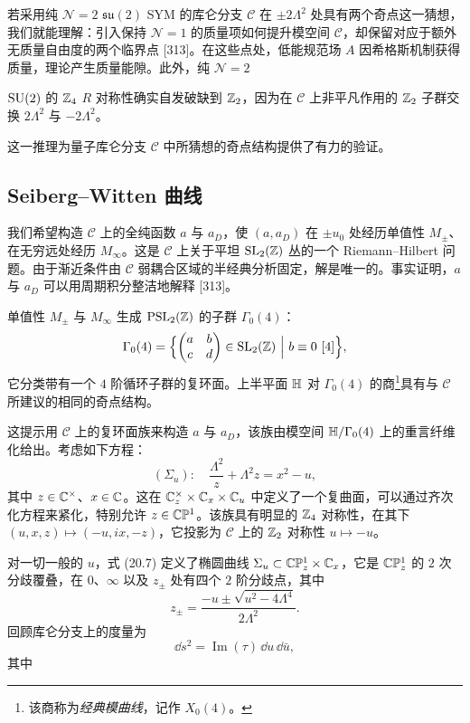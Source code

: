 若采用纯 $\mathcal{N}=2$ $\mathfrak{su}(2)$ SYM 的库仑分支 $\mathcal{C}$ 在 $\pm2\Lambda^2$ 处具有两个奇点这一猜想，我们就能理解：引入保持 $\mathcal{N}=1$ 的质量项如何提升模空间 $\mathcal{C}$，却保留对应于额外无质量自由度的两个临界点 [313]。在这些点处，低能规范场 $A$ 因希格斯机制获得质量，理论产生质量能隙。此外，纯 $\mathcal{N}=2$

$\operatorname{SU}(2)$ 的 $\mathbb{Z}_4$ $R$ 对称性确实自发破缺到 $\mathbb{Z}_2$，因为在 $\mathcal{C}$ 上非平凡作用的 $\mathbb{Z}_2$ 子群交换 $2\Lambda^2$ 与 $-2\Lambda^2$。

这一推理为量子库仑分支 $\mathcal{C}$ 中所猜想的奇点结构提供了有力的验证。

\subsection{Seiberg–Witten 曲线}

我们希望构造 $\mathcal{C}$ 上的全纯函数 $a$ 与 $a_D$，使 $(a,a_D)$ 在 $\pm u_0$ 处经历单值性 $M_\pm$、在无穷远处经历 $M_\infty$。这是 $\mathcal{C}$ 上关于平坦 $\operatorname{SL}_2(\mathbb{Z})$ 丛的一个 Riemann--Hilbert 问题。由于渐近条件由 $\mathcal{C}$ 弱耦合区域的半经典分析固定，解是唯一的。事实证明，$a$ 与 $a_D$ 可以用周期积分整洁地解释 [313]。

\begin{proposition}[20.12]
单值性 $M_\pm$ 与 $M_\infty$ 生成 $\mathrm{PSL}_2(\mathbb{Z})$ 的子群 $\Gamma_0(4)$：
\[
\Gamma_0(4)=\Bigl\{\begin{pmatrix}a&b\\c&d\end{pmatrix}\in\SL_2(\Z)\ \Big|\ b\equiv0\ [4]\Bigr\},
\]
它分类带有一个 $4$ 阶循环子群的复环面。上半平面 $\mathbb{H}$ 对 $\Gamma_0(4)$ 的商\footnote{该商称为\emph{经典模曲线}，记作 $X_0(4)$。}具有与 $\mathcal{C}$ 所建议的相同的奇点结构。
\end{proposition}

这提示用 $\mathcal{C}$ 上的复环面族来构造 $a$ 与 $a_D$，该族由模空间 $\mathbb{H}/\Gamma_0(4)$ 上的重言纤维化给出。考虑如下方程：
\begin{equation}
(\Sigma_u):\quad \frac{\Lambda^2}{z}+\Lambda^2 z=x^2-u,
\tag{20.7}
\end{equation}
其中 $z\in\mathbb{C}^\times$、$x\in\mathbb{C}$。这在 $\mathbb{C}^\times_z\times\mathbb{C}_x\times\mathbb{C}_u$ 中定义了一个复曲面，可以通过齐次化方程来紧化，特别允许 $z\in\mathbb{C}\mathbb{P}^1$。该族具有明显的 $\mathbb{Z}_4$ 对称性，在其下 $(u,x,z)\mapsto(-u,ix,-z)$，它投影为 $\mathcal{C}$ 上的 $\mathbb{Z}_2$ 对称性 $u\mapsto-u$。

对一切一般的 $u$，式 (20.7) 定义了椭圆曲线 $\Sigma_u\subset\mathbb{C}\mathbb{P}^1_z\times\mathbb{C}_x$，它是 $\mathbb{C}\mathbb{P}^1_z$ 的 $2$ 次分歧覆叠，在 $0$、$\infty$ 以及 $z_\pm$ 处有四个 $2$ 阶分歧点，其中
\begin{equation}
z_\pm=\frac{-u\pm\sqrt{u^2-4\Lambda^4}}{2\Lambda^2}.
\tag{20.8}
\end{equation}
回顾库仑分支上的度量为
\[
\dd s^2=\operatorname{Im}(\tau)\,\dd u\,\dd\bar u,
\]
其中

